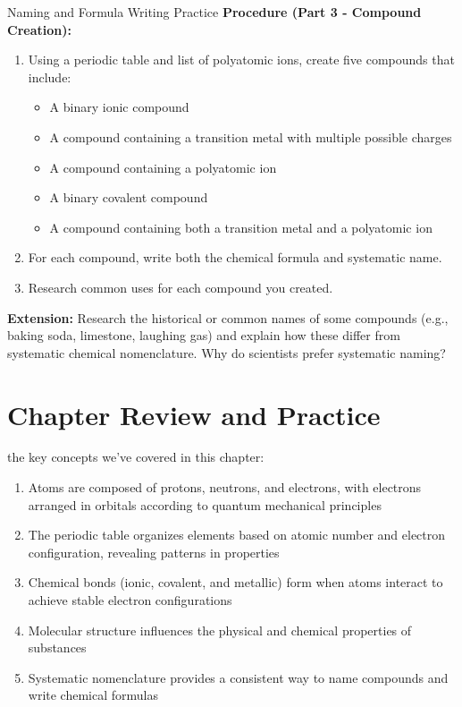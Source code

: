 \begin{investigation}{Naming and Formula Writing Practice}
\textbf{Procedure (Part 3 - Compound Creation):}
\begin{enumerate}
    \item Using a periodic table and list of polyatomic ions, create five compounds that include:
    \begin{itemize}
        \item A binary ionic compound
        \item A compound containing a transition metal with multiple possible charges
        \item A compound containing a polyatomic ion
        \item A binary covalent compound
        \item A compound containing both a transition metal and a polyatomic ion
    \end{itemize}
    
    \item For each compound, write both the chemical formula and systematic name.
    \item Research common uses for each compound you created.
\end{enumerate}

\textbf{Extension:} Research the historical or common names of some compounds (e.g., baking soda, limestone, laughing gas) and explain how these differ from systematic chemical nomenclature. Why do scientists prefer systematic naming?
\end{investigation}

\section{Chapter Review and Practice}

 the key concepts we've covered in this chapter:

\begin{enumerate}
    \item Atoms are composed of protons, neutrons, and electrons, with electrons arranged in orbitals according to quantum mechanical principles
    \item The periodic table organizes elements based on atomic number and electron configuration, revealing patterns in properties
    \item Chemical bonds (ionic, covalent, and metallic) form when atoms interact to achieve stable electron configurations
    \item Molecular structure influences the physical and chemical properties of substances
    \item Systematic nomenclature provides a consistent way to name compounds and write chemical formulas
\end{enumerate}

